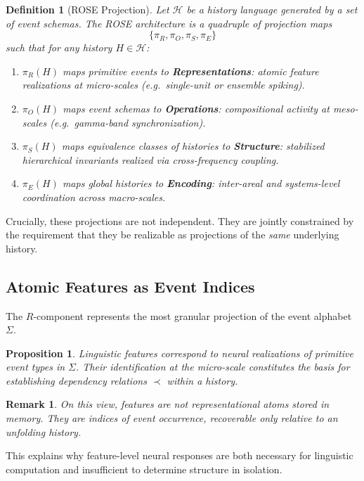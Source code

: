 \documentclass[11pt]{article}
\newtheorem{definition}{Definition}
\newtheorem{remark}{Remark}
\newtheorem{proposition}{Proposition}
\begin{document}
\begin{definition}[ROSE Projection]
Let $\mathcal{H}$ be a history language generated by a set of event schemas. The ROSE architecture is a quadruple of projection maps
\[
\{\pi_R, \pi_O, \pi_S, \pi_E\}
\]
such that for any history $H \in \mathcal{H}$:
\begin{enumerate}
  \item $\pi_R(H)$ maps primitive events to \textbf{Representations}: atomic feature realizations at micro-scales (e.g.\ single-unit or ensemble spiking).
  \item $\pi_O(H)$ maps event schemas to \textbf{Operations}: compositional activity at meso-scales (e.g.\ gamma-band synchronization).
  \item $\pi_S(H)$ maps equivalence classes of histories to \textbf{Structure}: stabilized hierarchical invariants realized via cross-frequency coupling.
  \item $\pi_E(H)$ maps global histories to \textbf{Encoding}: inter-areal and systems-level coordination across macro-scales.
\end{enumerate}
\end{definition}

Crucially, these projections are not independent. They are jointly constrained by the requirement that they be realizable as projections of the \emph{same} underlying history.

\subsection{Atomic Features as Event Indices}

The $R$-component represents the most granular projection of the event alphabet $\Sigma$.

\begin{proposition}
Linguistic features correspond to neural realizations of primitive event types in $\Sigma$. Their identification at the micro-scale constitutes the basis for establishing dependency relations $\prec$ within a history.
\end{proposition}

\begin{remark}
On this view, features are not representational atoms stored in memory. They are \emph{indices of event occurrence}, recoverable only relative to an unfolding history.
\end{remark}

This explains why feature-level neural responses are both necessary for linguistic computation and insufficient to determine structure in isolation.
\end{document}
